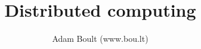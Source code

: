 \documentclass[oneside]{book}
\begin{document}
\author{Adam Boult (www.bou.lt)}
\title{Distributed computing}
\maketitle

\setcounter{tocdepth}{0}
\tableofcontents


\end{document}
